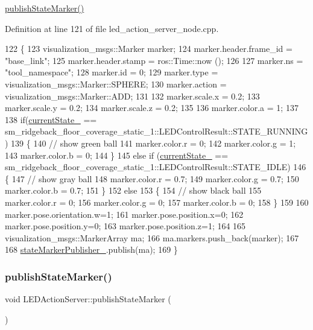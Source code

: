 \hyperlink{classLEDActionServer_a73bb754ac2347c50660624ad92315895}{publish\+State\+Marker()} 

Definition at line 121 of file led\+\_\+action\+\_\+server\+\_\+node.\+cpp.


\begin{DoxyCode}
122 \{
123     visualization\_msgs::Marker marker;
124     marker.header.frame\_id = \textcolor{stringliteral}{"base\_link"};
125     marker.header.stamp = ros::Time::now ();
126 
127     marker.ns = \textcolor{stringliteral}{"tool\_namespace"};
128     marker.id = 0;
129     marker.type = visualization\_msgs::Marker::SPHERE;
130     marker.action = visualization\_msgs::Marker::ADD;
131     
132     marker.scale.x = 0.2;
133     marker.scale.y = 0.2;
134     marker.scale.z = 0.2;
135 
136     marker.color.a = 1;
137 
138     \textcolor{keywordflow}{if}(\hyperlink{classLEDActionServer_a1dc456e987dc331501ad6ff2215661ff}{currentState\_} == sm\_ridgeback\_floor\_coverage\_static\_1::LEDControlResult::STATE\_RUNNING)
139     \{
140       \textcolor{comment}{// show green ball}
141       marker.color.r = 0;
142       marker.color.g = 1;
143       marker.color.b = 0;
144     \}
145     \textcolor{keywordflow}{else} \textcolor{keywordflow}{if} (\hyperlink{classLEDActionServer_a1dc456e987dc331501ad6ff2215661ff}{currentState\_} == 
      sm\_ridgeback\_floor\_coverage\_static\_1::LEDControlResult::STATE\_IDLE)
146     \{
147       \textcolor{comment}{// show gray ball}
148       marker.color.r = 0.7;
149       marker.color.g = 0.7;
150       marker.color.b = 0.7;
151     \}
152     \textcolor{keywordflow}{else}
153     \{
154       \textcolor{comment}{// show black ball}
155       marker.color.r = 0;
156       marker.color.g = 0;
157       marker.color.b = 0;
158     \}
159 
160     marker.pose.orientation.w=1;
161     marker.pose.position.x=0;
162     marker.pose.position.y=0;
163     marker.pose.position.z=1;
164 
165     visualization\_msgs::MarkerArray ma;
166     ma.markers.push\_back(marker);
167 
168     \hyperlink{classLEDActionServer_a4168a1e4a17eb1d65aaa059ce0c52086}{stateMarkerPublisher\_}.publish(ma);
169 \}
\end{DoxyCode}
\mbox{\label{classLEDActionServer_a73bb754ac2347c50660624ad92315895}} 
\subsubsection{\texorpdfstring{publish\+State\+Marker()}{publishStateMarker()}\hspace{0.1cm}{\footnotesize\ttfamily [4/5]}}
{\footnotesize\ttfamily void L\+E\+D\+Action\+Server\+::publish\+State\+Marker (\begin{DoxyParamCaption}{ }\end{DoxyParamCaption})\hspace{0.3cm}{\ttfamily [inline]}}


